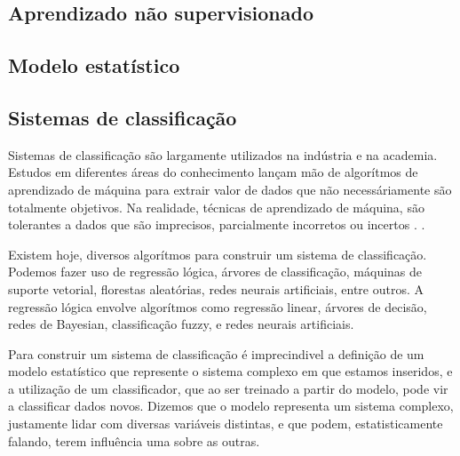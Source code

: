\subsection{Aprendizado não supervisionado}

\subsection{Modelo estatístico}

\subsection{Sistemas de classificação}
Sistemas de classificação são largamente utilizados na indústria e na academia. Estudos em diferentes áreas do conhecimento
lançam mão de algorítmos de aprendizado de máquina para extrair valor de dados que não necessáriamente são totalmente objetivos. Na realidade,
técnicas de aprendizado de máquina, são tolerantes a dados que são imprecisos, parcialmente incorretos ou incertos \cite{Malhotra}. .

Existem hoje, diversos algorítmos para construir um sistema de classificação. Podemos fazer uso de regressão lógica, árvores de classificação, máquinas de suporte vetorial, florestas aleatórias, redes neurais artificiais, entre outros.
A regressão lógica envolve algorítmos como regressão linear, árvores de decisão, redes de Bayesian, classificação fuzzy, e redes neurais artificiais\cite{Louridas}.


Para construir um sistema de classificação é imprecindivel a definição de um modelo estatístico que represente o sistema complexo em que estamos inseridos, e a utilização de um classificador, que ao ser treinado a partir do modelo, pode vir a classificar dados novos. Dizemos que o modelo representa um sistema complexo, justamente lidar com diversas variáveis distintas, e que podem, estatisticamente falando, terem influência uma sobre as outras.


\begin{comment}
 1 - Primeiro podemos começar definindo conceitos básicos como categoria, modelo de dados, e
 quais modelos alternativos ao bayer existem, e porquê utilizamos o bayer.

 Definir como um modelo de dados é construido, isso implica em abordar os conceitos estatísticos visto
 nas vídeo aulas do youtube.

 Definir como algorítmo de bayer utiliza o modelo de dados.
\end{comment}
